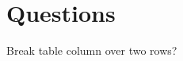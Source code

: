 
\section{Questions}
\begin{itemize*}
     \item{} Break table column over two rows?
\end{itemize*}
